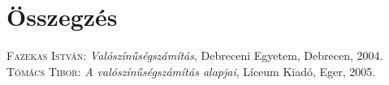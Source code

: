 \documentclass[
]{thesis-ekf}
\theoremstyle{definition}
\theoremstyle{remark}
\begin{document}
\chapter*{Összegzés}

\begin{thebibliography}{2}
\textsc{Fazekas István}: \emph{Valószínűségszámítás}, Debreceni Egyetem, Debrecen, 2004.
\textsc{Tómács Tibor}: \emph{A valószínűségszámítás alapjai}, Líceum Kiadó, Eger, 2005.
\end{thebibliography}


\end{document}
